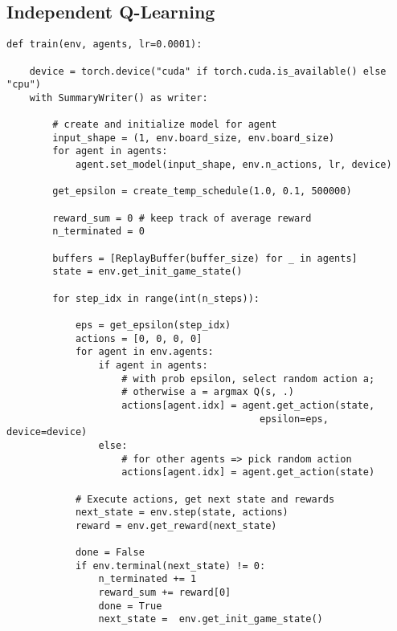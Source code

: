 \begin{appendices}

\chapter{Independent Q-Learning}
\label{app:iql}

\begin{verbatim}
def train(env, agents, lr=0.0001):
    
    device = torch.device("cuda" if torch.cuda.is_available() else "cpu")
    with SummaryWriter() as writer:
        
        # create and initialize model for agent
        input_shape = (1, env.board_size, env.board_size)
        for agent in agents:
            agent.set_model(input_shape, env.n_actions, lr, device)

        get_epsilon = create_temp_schedule(1.0, 0.1, 500000)

        reward_sum = 0 # keep track of average reward
        n_terminated = 0

        buffers = [ReplayBuffer(buffer_size) for _ in agents]
        state = env.get_init_game_state()
        
        for step_idx in range(int(n_steps)):
            
            eps = get_epsilon(step_idx)
            actions = [0, 0, 0, 0]
            for agent in env.agents:
                if agent in agents:
                    # with prob epsilon, select random action a;
                    # otherwise a = argmax Q(s, .)
                    actions[agent.idx] = agent.get_action(state, 
                                            epsilon=eps, device=device)
                else:
                    # for other agents => pick random action
                    actions[agent.idx] = agent.get_action(state)
            
            # Execute actions, get next state and rewards
            next_state = env.step(state, actions)
            reward = env.get_reward(next_state)

            done = False
            if env.terminal(next_state) != 0:
                n_terminated += 1
                reward_sum += reward[0]
                done = True
                next_state =  env.get_init_game_state()


\end{verbatim}
\end{appendices}
